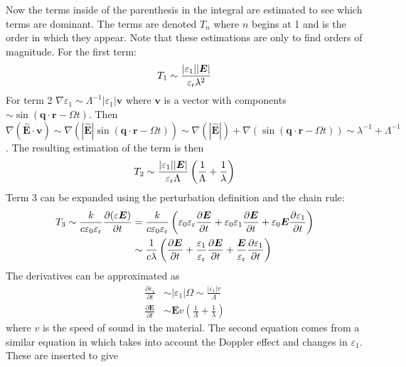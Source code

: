 \documentclass[11pt,twoside]{eitExjobb}
\begin{document}
	Now the terms inside of the parenthesis in the integral are estimated to see which terms are dominant. The terms are denoted $T_n$ where $n$ begins at 1 and is the order in which they appear. Note that these estimations are only to find orders of magnitude. For the first term:
	\begin{equation*}
		T_1 \sim \frac{|\varepsilon_1| |\bm{E}|}{\varepsilon_{\mathrm{r}} \lambda^2}
	\end{equation*}
	For term 2 $\nabla \varepsilon_1 \sim \Lambda^{-1} |\varepsilon_1| \bm{v}$ where $\bm{v}$ is a vector with components $\sim \sin(\bm{q} \cdot \bm{r} - \Omega t)$. Then $\nabla (\bm{\hat{E}} \cdot \bm{v}) \sim \nabla(|\bm{\hat{E}}| \sin(\bm{q} \cdot \bm{r} - \Omega t)) \sim \nabla(|\bm{\hat{E}}|) + \nabla(\sin(\bm{q} \cdot \bm{r} - \Omega t)) \sim \lambda^{-1} + \Lambda^{-1}$. The resulting estimation of the term is then
	\begin{equation*}
		T_2 \sim \frac{|\varepsilon_1| |\bm{E}|}{\varepsilon_{\mathrm{r}} \Lambda} \left( \frac{1}{\Lambda} + \frac{1}{\lambda} \right)
	\end{equation*}
	Term 3 can be expanded using the perturbation definition and the chain rule:
	\begin{equation*}
	\begin{split}
		T_3 \sim \frac{k}{c\varepsilon_0\varepsilon_{\mathrm{r}}} \frac{\partial (\varepsilon \bm{E})}{\partial t} &= \frac{k}{c\varepsilon_0\varepsilon_{\mathrm{r}}} \left( \varepsilon_0\varepsilon_{\mathrm{r}} \frac{\partial \bm{E}}{\partial t} + \varepsilon_0\varepsilon_1 \frac{\partial \bm{E}}{\partial t} + \varepsilon_0\bm{E} \frac{\partial \varepsilon_1}{\partial t}\right) \\
		&\sim \frac{1}{c\lambda} \left( \frac{\partial \bm{E}}{\partial t} + \frac{\varepsilon_1}{\varepsilon_{\mathrm{r}}} \frac{\partial \bm{E}}{\partial t} + \frac{\bm{E}}{\varepsilon_{\mathrm{r}}} \frac{\partial \varepsilon_1}{\partial t} \right)
	\end{split}
	\end{equation*}
	The derivatives can be approximated as
	\begin{align*}
		\frac{\partial \varepsilon_1}{\partial t} &\sim |\varepsilon_1|\Omega \sim \frac{|\varepsilon_1| v}{\Lambda} \\
		\frac{\partial \bm{E}}{\partial t} &\sim \bm{E} v \left( \frac{1}{\Lambda} + \frac{1}{\lambda} \right)
	\end{align*}
	where $v$ is the speed of sound in the material. The second equation comes from a similar equation in \cite{Tatarskii1971} which takes into account the Doppler effect and changes in $\varepsilon_1$. These are inserted to give
\end{document}
